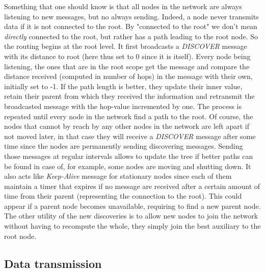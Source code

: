 \documentclass{article}
\begin{document}
Something that one should know is that all nodes in the network are always listening to new messages, but no always sending. Indeed, a node never transmits data if it is not connected to the root. By "connected to the root" we don't mean \textit{directly} connected to the root, but rather has a path leading to the root node. So the routing begins at the root level. It first broadcasts a \textit{DISCOVER} message with its distance to root (here thus set to 0 since it is itself). Every node being listening, the ones that are in the root scope get the message and compare the distance received (computed in number of hops) in the message with their own, initially set to -1. If the path length is better, they update their inner value, retain their parent from which they received the information and retransmit the broadcasted message with the hop-value incremented by one. The process is repeated until every node in the network find a path to the root. Of course, the nodes that cannot by reach by any other nodes in the network are left apart if not moved later, in that case they will receive a \textit{DISCOVER} message after some time since the nodes are permanently sending discovering messages. Sending those messages at regular intervals allows to update the tree if better paths can be found in case of, for example, some nodes are moving and shutting down. It also acts like \textit{Keep-Alive} message for stationary nodes since each of them maintain a timer that expires if no message are received after a certain amount of time from their parent (representing the connection to the root). This could appear if a parent node becomes unavailable, requiring to find a new parent node. The other utility of the new discoveries is to allow new nodes to join the network without having to recompute the whole, they simply join the best auxiliary to the root node.

\subsection{Data transmission}
\end{document}
